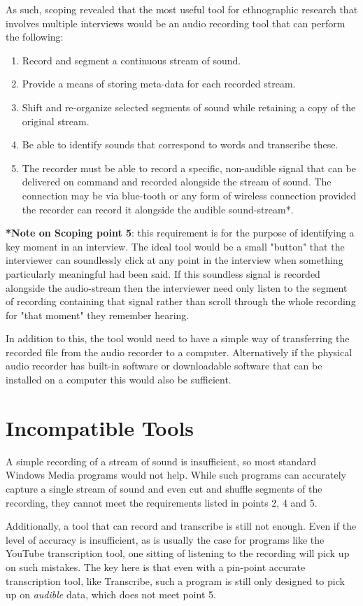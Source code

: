 \documentclass{article}
\begin{document}
As such, scoping revealed that the most useful tool for ethnographic research that involves multiple interviews would be an audio recording tool that can perform the following:
\begin{enumerate}
\item Record and segment a continuous stream of sound.
\item Provide a means of storing meta-data for each recorded stream.
\item Shift and re-organize selected segments of sound while retaining a copy of the original stream.
\item Be able to identify sounds that correspond to words and transcribe these.
\item The recorder must be able to record a specific, non-audible signal that can be delivered on command and recorded alongside the stream of sound. The connection may be via blue-tooth or any form of wireless connection provided the recorder can record it alongside the audible sound-stream*.
\end{enumerate}

\textbf{*Note on Scoping point 5}: this requirement is for the purpose of identifying a key moment in an interview. The ideal tool would be a small "button" that the interviewer can soundlessly click at any point in the interview when something particularly meaningful had been said. If this soundless signal is recorded alongside the audio-stream then the interviewer need only listen to the segment of recording containing that signal rather than scroll through the whole recording for "that moment" they remember hearing.

In addition to this, the tool would need to have a simple way of transferring the recorded file from the audio recorder to a computer. Alternatively if the physical audio recorder has built-in software or downloadable software that can be installed on a computer this would also be sufficient.

\section{Incompatible Tools}
A simple recording of a stream of sound is insufficient, so most standard Windows Media programs would not help. While such programs can accurately capture a single stream of sound and even cut and shuffle segments of the recording, they cannot meet the requirements listed in points 2, 4 and 5.

Additionally, a tool that can record and transcribe is still not enough. Even if the level of accuracy is insufficient, as is usually the case for programs like the YouTube transcription tool, one sitting of listening to the recording will pick up on such mistakes. The key here is that even with a pin-point accurate transcription tool, like Transcribe, such a program is still only designed to pick up on \textit{audible} data, which does not meet point 5.
\end{document}
